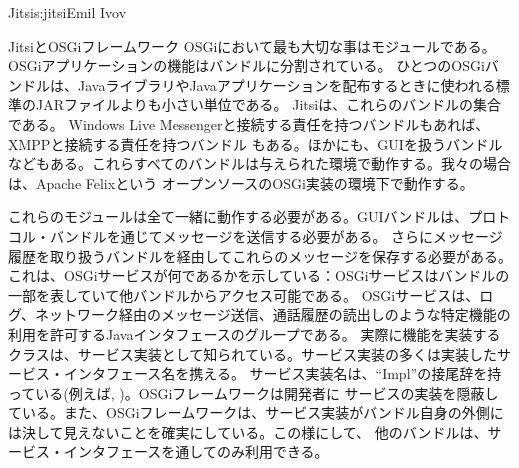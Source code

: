 \begin{aosachapter}{Jitsi}{s:jitsi}{Emil Ivov}
\begin{aosasect1}{JitsiとOSGiフレームワーク}
OSGiにおいて最も大切な事はモジュールである。OSGiアプリケーションの機能はバンドルに分割されている。
ひとつのOSGiバンドルは、JavaライブラリやJavaアプリケーションを配布するときに使われる標準のJARファイルよりも小さい単位である。
Jitsiは、これらのバンドルの集合である。 Windows Live Messengerと接続する責任を持つバンドルもあれば、XMPPと接続する責任を持つバンドル
もある。ほかにも、GUIを扱うバンドルなどもある。これらすべてのバンドルは与えられた環境で動作する。我々の場合は、Apache Felixという
オープンソースのOSGi実装の環境下で動作する。

これらのモジュールは全て一緒に動作する必要がある。GUIバンドルは、プロトコル・バンドルを通じてメッセージを送信する必要がある。
さらにメッセージ履歴を取り扱うバンドルを経由してこれらのメッセージを保存する必要がある。
これは、OSGiサービスが何であるかを示している：OSGiサービスはバンドルの一部を表していて他バンドルからアクセス可能である。
OSGiサービスは、ログ、ネットワーク経由のメッセージ送信、通話履歴の読出しのような特定機能の利用を許可するJavaインタフェースのグループである。
実際に機能を実装するクラスは、サービス実装として知られている。サービス実装の多くは実装したサービス・インタフェース名を携える。 
サービス実装名は、``Impl''の接尾辞を持っている(例えば, )。OSGiフレームワークは開発者に
サービスの実装を隠蔽している。また、OSGiフレームワークは、サービス実装がバンドル自身の外側には決して見えないことを確実にしている。この様にして、
他のバンドルは、サービス・インタフェースを通してのみ利用できる。


\end{aosasect1}
\end{aosachapter}
